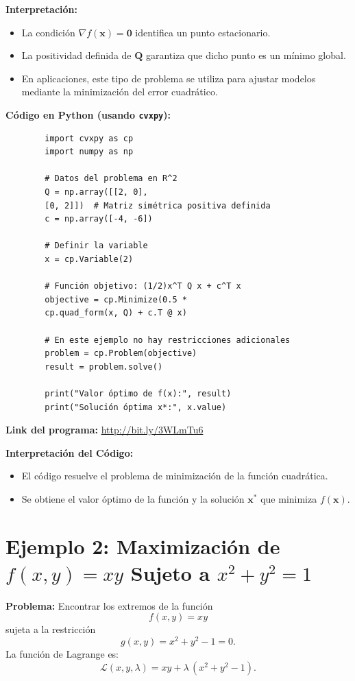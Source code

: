 \documentclass[12pt,a4,oneside]{book}
\begin{document}
	\textbf{Interpretación:}  
	\begin{itemize}
		\item La condición \(\nabla f(\mathbf{x}) = \mathbf{0}\) identifica un punto estacionario.
		\item La positividad definida de \(\mathbf{Q}\) garantiza que dicho punto es un mínimo global.
		\item En aplicaciones, este tipo de problema se utiliza para ajustar modelos mediante la minimización del error cuadrático.
	\end{itemize}
	
	\textbf{Código en Python (usando \texttt{cvxpy}):}
	\begin{verbatim}
		import cvxpy as cp
		import numpy as np
		
		# Datos del problema en R^2
		Q = np.array([[2, 0],
		[0, 2]])  # Matriz simétrica positiva definida
		c = np.array([-4, -6])
		
		# Definir la variable
		x = cp.Variable(2)
		
		# Función objetivo: (1/2)x^T Q x + c^T x
		objective = cp.Minimize(0.5 *
		cp.quad_form(x, Q) + c.T @ x)
		
		# En este ejemplo no hay restricciones adicionales
		problem = cp.Problem(objective)
		result = problem.solve()
		
		print("Valor óptimo de f(x):", result)
		print("Solución óptima x*:", x.value)
	\end{verbatim}
	
	\textbf{Link del programa:} \url{http://bit.ly/3WLmTu6}
	
	\textbf{Interpretación del Código:}  
	\begin{itemize}
		\item El código resuelve el problema de minimización de la función cuadrática.
		\item Se obtiene el valor óptimo de la función y la solución \(\mathbf{x}^*\) que minimiza \(f(\mathbf{x})\).
	\end{itemize}
	
	\section{Ejemplo 2: Maximización de \( f(x,y) = xy \) Sujeto a \( x^2 + y^2 = 1 \)}
	
	\textbf{Problema:}  
	Encontrar los extremos de la función
	\[
	f(x,y) = xy
	\]
	sujeta a la restricción
	\[
	g(x,y) = x^2 + y^2 - 1 = 0.
	\]
	La función de Lagrange es:
	\[
	\mathcal{L}(x,y,\lambda) = xy + \lambda\,(x^2+y^2-1).
	\]
	
\end{document}
